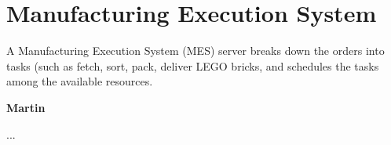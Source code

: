 \chapter{Manufacturing Execution System}\label{chap:mes_server_chapter}

A Manufacturing Execution System (MES) server breaks down the orders into tasks (such as fetch, sort, pack, deliver LEGO bricks, and schedules the tasks among the available resources.

\textbf{Martin}

...



%



